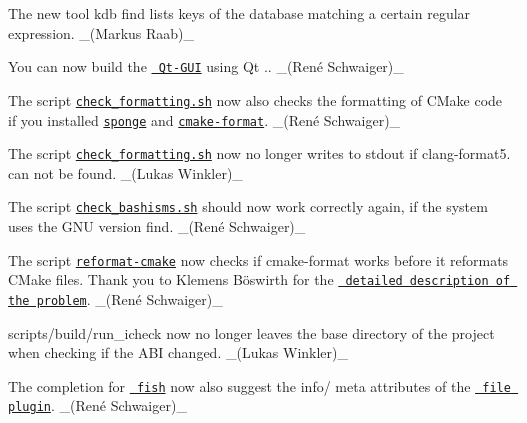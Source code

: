 \begin{DoxyItemize}
\item The new tool {\ttfamily kdb find} lists keys of the database matching a certain regular expression. \+\_\+(\+Markus Raab)\+\_\+
\item You can now build the \href{https://www.libelektra.org/tools/qt-gui}{\texttt{ Qt-\/\+G\+UI}} using Qt {.}. \+\_\+(René Schwaiger)\+\_\+
\end{DoxyItemize}


\begin{DoxyItemize}
\item The script \href{https://master.libelektra.org/tests/shell/check_formatting.sh}{\texttt{ {\ttfamily check\+\_\+formatting.\+sh}}} now also checks the formatting of C\+Make code if you installed \href{https://joeyh.name/code/moreutils}{\texttt{ {\ttfamily sponge}}} and \href{https://github.com/cheshirekow/cmake_format}{\texttt{ {\ttfamily cmake-\/format}}}. \+\_\+(René Schwaiger)\+\_\+
\item The script \href{https://master.libelektra.org/tests/shell/check_formatting.sh}{\texttt{ {\ttfamily check\+\_\+formatting.\+sh}}} now no longer writes to stdout if clang-\/format5. can not be found. \+\_\+(\+Lukas Winkler)\+\_\+
\item The script \href{https://master.libelektra.org/tests/shell/check_bashisms.sh}{\texttt{ {\ttfamily check\+\_\+bashisms.\+sh}}} should now work correctly again, if the system uses the G\+NU version {\ttfamily find}. \+\_\+(René Schwaiger)\+\_\+
\item The script \href{https://master.libelektra.org/scripts/dev/reformat-cmake}{\texttt{ {\ttfamily reformat-\/cmake}}} now checks if {\ttfamily cmake-\/format} works before it reformats C\+Make files. Thank you to Klemens Böswirth for the \href{https://github.com/ElektraInitiative/libelektra/pull/1903\#discussion_r189332987}{\texttt{ detailed description of the problem}}. \+\_\+(René Schwaiger)\+\_\+
\item {\ttfamily scripts/build/run\+\_\+icheck} now no longer leaves the base directory of the project when checking if the A\+BI changed. \+\_\+(\+Lukas Winkler)\+\_\+
\item The completion for \href{http://fishshell.com}{\texttt{ fish}} now also suggest the {\ttfamily info/} meta attributes of the \href{https://www.libelektra.org/plugins/file}{\texttt{ file plugin}}. \+\_\+(René Schwaiger)\+\_\+
\end{DoxyItemize}


